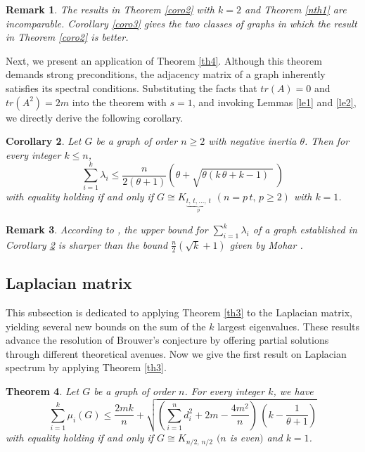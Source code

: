 \documentclass[12pt]{article}
\newtheorem{theorem}{Theorem}[section]
\newtheorem{corollary}[theorem]{Corollary}
\newtheorem{remark}[theorem]{Remark}
\begin{document}
   \begin{remark} {\rm The results in Theorem \ref{coro2} with $k=2$ and Theorem \ref{nth1} are
   incomparable. Corollary \ref{coro3} gives the two classes of
   graphs in which the result in Theorem \ref{coro2} is better.}
 \end{remark}
 Next, we present an application of Theorem \ref{th4}. Although this theorem demands strong preconditions, the adjacency matrix of a graph inherently satisfies its spectral conditions. Substituting the facts that $tr(A)=0$ and $tr(A^2)=2m$ into the theorem with $s=1$, and invoking Lemmas \ref{le1} and \ref{le2}, we directly derive the following corollary.
 \begin{corollary} {\rm \cite{DMS}}\label{nco1} Let $G$ be a graph of order $n\geq 2$ with negative inertia $\theta$. Then for every integer $k\leq n$,
 \begin{equation*}
 \sum_{i=1}^{k}\lambda_i\leq \frac{n}{2\left(\theta+1\right)}\left(\theta+\sqrt{\theta\left(k\,\theta+k-1\right)\,\,}~\right)
 \end{equation*}
 with equality holding if and only if $G\cong K_{\underbrace{t,\,t,\ldots,\,t}_p}$ $(n=p\,t,\,p\geq 2)$ with $k=1$.
 \end{corollary}

\begin{remark}{\rm 
According to \cite{DMS}, the upper bound for $\sum_{i=1}^{k} \lambda_i$ of a graph established in Corollary \ref{nco1} is sharper than the bound $\frac{n}{2}(\sqrt{k} + 1)$ given by Mohar \cite{MOHAR}.}
\end{remark}



  \subsection{Laplacian matrix}
 This subsection is dedicated to applying Theorem \ref{th3} to the Laplacian matrix, yielding several new bounds on the sum of the $k$ largest eigenvalues. These results advance the resolution of Brouwer's conjecture by offering partial solutions through different theoretical avenues.
 Now we give the first result on Laplacian spectrum by applying Theorem \ref{th3}.
  \begin{theorem}\label{thm31}
   Let $G$ be a graph of order $n$. For every integer $k$, we have
 \begin{equation}
 \sum_{i=1}^{k}\mu_i(G)\leq\frac{2mk}{n}+\sqrt{\left(\sum_{i=1}^{n}d_i^2+2m-
 \frac{4m^2}{n}\right)\,\left(k-\frac{1}{\theta+1}\right)} \label{sunm3}
 \end{equation}
 with equality holding if and only if $G\cong K_{n/2,\,n/2}$ $(n$ is even$)$ and
 $k=1$.
 \end{theorem}
 
\end{document}
